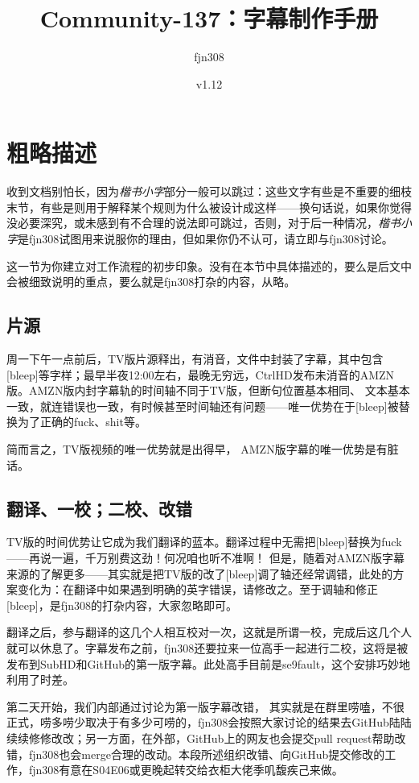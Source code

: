 \documentclass{ctexart}
\title{Community-137：字幕制作手册}
\author{fjn308}
\date{v1.12}
\begin{document}
\maketitle

\section{粗略描述}

收到文档别怕长，因为\emph{\small 楷书小字}部分一般可以跳过：这些文字有些是不重要的细枝末节，有些是则用于解释某个规则为什么被设计成这样——换句话说，如果你觉得没必要深究，或未感到有不合理的说法即可跳过，否则，对于后一种情况，\emph{\small 楷书小字}是fjn308试图用来说服你的理由，但如果你仍不认可，请立即与fjn308讨论。

这一节为你建立对工作流程的初步印象。没有在本节中具体描述的，要么是后文中会被细致说明的重点，要么就是fjn308打杂的内容，从略。

\subsection{片源}

周一下午一点前后，TV版片源释出，有消音，文件中封装了字幕，其中包含[bleep]等字样；最早半夜12:00左右，最晚无穷远，CtrlHD发布未消音的AMZN版。AMZN版内封字幕轨的时间轴不同于TV版，但断句位置基本相同、{\color{red} 文本基本一致，就连错误也一致，有时候甚至时间轴还有问题——唯一优势在于[bleep]被替换为了正确的fuck、shit等}。

简而言之，TV版视频的唯一优势就是出得早，{\color{red} AMZN版字幕的唯一优势是有脏话}。

\subsection{翻译、一校；二校、改错}\label{correction}

TV版的时间优势让它成为我们翻译的蓝本。翻译过程中无需把[bleep]替换为fuck——再说一遍，千万别费这劲！何况咱也听不准啊！{\color{red} 但是，随着对AMZN版字幕来源的了解更多——其实就是把TV版的改了[bleep]调了轴还经常调错，此处的方案变化为：在翻译中如果遇到明确的英字错误，请修改之}。至于调轴和修正[bleep]，是fjn308的打杂内容，大家忽略即可。

翻译之后，参与翻译的这几个人相互校对一次，这就是所谓一校，完成后这几个人就可以休息了。字幕发布之前，fjn308还要拉来一位高手一起进行二校，这将是被发布到SubHD和GitHub的第一版字幕。此处高手目前是se9fault，这个安排巧妙地利用了时差。

第二天开始，我们内部通过讨论为第一版字幕改错，{\color{red} 其实就是在群里唠嗑，不很正式，唠多唠少取决于有多少可唠的}，fjn308会按照大家讨论的结果去GitHub陆陆续续修修改改；另一方面，在外部，GitHub上的网友也会提交pull request帮助改错，fjn308也会merge合理的改动。本段所述组织改错、向GitHub提交修改的工作，fjn308有意在S04E06或更晚起转交给衣柜大佬季叽馥疾己来做。
\end{document}
